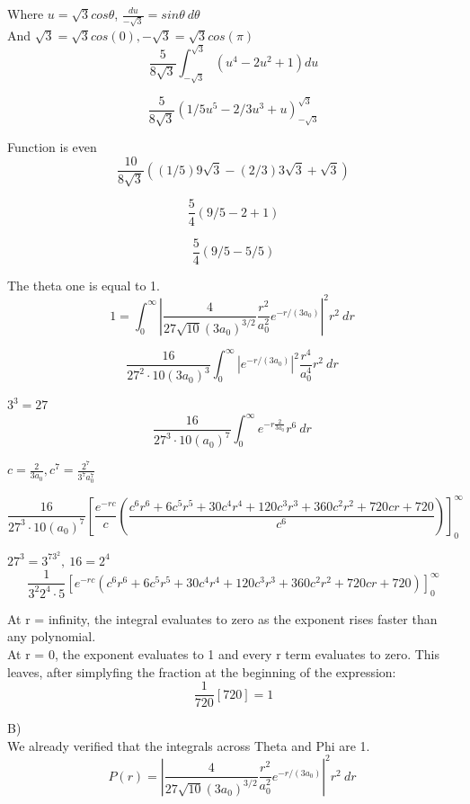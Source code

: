 \documentclass{article}
\begin{document}
Where $u = \sqrt{3}cos\theta$, $\frac{du}{-\sqrt{3}} = sin\theta\ d\theta$ \\
And $\sqrt{3} = \sqrt{3}cos(0), -\sqrt{3} = \sqrt{3}cos(\pi)$ \\

$$ \frac{5}{8\sqrt{3}} \int_{-\sqrt{3}}^{\sqrt{3}}
\left(u^4 - 2u^2 + 1\right) du
$$

$$ \frac{5}{8\sqrt{3}} 
\left(1/5 u^5 - 2/3 u^3 + u\right)_{-\sqrt{3}}^{\sqrt{3}}
$$

Function is even
$$ \frac{10}{8\sqrt{3}} 
\left((1/5) 9\sqrt{3} - (2/3) 3\sqrt{3} + \sqrt{3}\right)
$$

$$ \frac{5}{4} 
\left(9/5 - 2 + 1\right)
$$

$$ \frac{5}{4} 
\left(9/5 - 5/5\right)
$$

The theta one is equal to 1. \\

$$ 1 = \int_0^\infty 
\left|\frac{4}{27\sqrt{10}(3a_0)^{3/2}}\frac{r^2}{a_0^2} e^{-r/(3a_0)}\right|
^2 r^2\ dr\ 
$$

$$ \frac{16}{27^2 \cdot 10(3a_0)^{3}} \int_0^\infty 
\left|e^{-r/(3a_0)}\right|
^2 \frac{r^4}{a_0^4} r^2\ dr\ 
$$

$3^3 = 27$ \\
$$ \frac{16}{27^3 \cdot 10(a_0)^{7}}
\int_0^\infty 
e^{-r\frac{2}{3a_0}}
r^6\ dr\ 
$$

\newpage
$c = \frac{2}{3a_0}, c^7 = \frac{2^7}{3^7a_0^7}$

$$ \frac{16}{27^3 \cdot 10(a_0)^{7}}
\left[
	\frac{e^{-rc}}{c}
	\left(\frac{c^6r^6 + 6c^5r^5 + 30c^4r^4 + 120c^3r^3 + 360c^2r^2 + 720cr + 720}{c^6}
\right)
\right]^\infty_0
$$

$27^3 = 3^73^2,\ 16 = 2^4$
$$ \frac{1}{3^2 2^4 \cdot 5}
\left[
	e^{-rc}
	\left(c^6r^6 + 6c^5r^5 + 30c^4r^4 + 120c^3r^3 + 360c^2r^2 + 720cr + 720
\right)
\right]^\infty_0
$$

At r = infinity, the integral evaluates to zero as the exponent rises faster than any polynomial.  \\
At r = 0, the exponent evaluates to 1 and every r term evaluates to zero. This leaves, after simplyfing the fraction at the beginning of the expression:
$$ \frac{1}{720} \left[720\right] = 1 $$

B)\\
We already verified that the integrals across Theta and Phi are 1. 
$$ P(r) = 
\left|\frac{4}{27\sqrt{10}(3a_0)^{3/2}}\frac{r^2}{a_0^2} e^{-r/(3a_0)}\right|
^2 r^2\ dr\ 
$$
\end{document}
